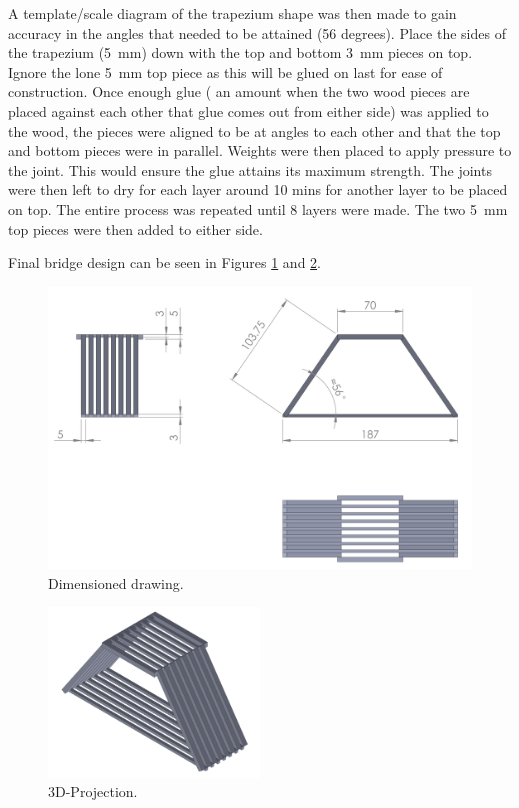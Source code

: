 \documentclass[12pt]{article}
\begin{document}
A template/scale diagram of the trapezium shape was then made to gain accuracy in the angles that needed to be attained (56 degrees). Place the sides of the trapezium (5~mm) down with the top and bottom 3~mm pieces on top. Ignore the lone 5~mm top piece as this will be glued on last for ease of construction. Once enough glue ( an amount when the two wood pieces are placed against each other that glue comes out from either side) was applied to the wood, the pieces were aligned to be at angles to each other and that the top and bottom pieces were in parallel. Weights were then placed to apply pressure to the joint. This would ensure the glue attains its maximum strength. The joints were then left to dry for each layer around 10 mins for another layer to be placed on top. The entire process was repeated until 8 layers were made.  The two 5~mm top pieces were then added to either side.


		Final bridge design can be seen in Figures \ref{dim} and \ref{proj}.
		\begin{figure}[h!]
			\centering
			\includegraphics[width=\textwidth]{dim}
			\caption{Dimensioned drawing.}
			\label{dim}
		\end{figure}
		\begin{figure}[h!]
			\centering
			\includegraphics[width=0.5\textwidth]{proj}
			\caption{3D-Projection.}
			\label{proj}
		\end{figure}
\end{document}
